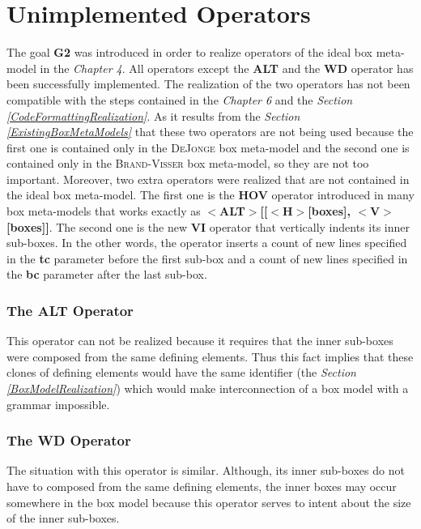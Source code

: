 \documentclass[12pt,notitlepage,a4paper]{report}
\begin{document}
\section{Unimplemented Operators}
\label{UnimplementedOperators}
The goal \textbf{G2} was introduced in order to realize operators of the ideal box meta-model in the \textit{Chapter 4}. All operators except the \textbf{ALT} and the \textbf{WD} operator has been successfully implemented. The realization of the two operators has not been compatible with the steps contained in the \textit{Chapter 6} and the \textit{Section \ref{CodeFormattingRealization}}. As it results from the \textit{Section \ref{ExistingBoxMetaModels}} that these two operators are not being used because the first one is contained only in the \textsc{DeJonge} box meta-model and the second one is contained only in the \textsc{Brand-Visser} box meta-model, so they are not too important. Moreover, two extra operators were realized that are not contained in the ideal box meta-model. The first one is the \textbf{HOV} operator introduced in many box meta-models that works exactly as \textbf{$<$ALT$>$[[$<$H$>$[boxes], $<$V$>$[boxes]]}. The second one is the new \textbf{VI} operator that vertically indents its inner sub-boxes. In the other words, the operator inserts a count of new lines specified in the \textbf{tc} parameter before the first sub-box and a count of  new lines specified in the \textbf{bc} parameter after the last sub-box.

\subsubsection{The ALT Operator}
This operator can not be realized because it requires that the inner sub-boxes were composed from the same defining elements. Thus this fact implies that these clones of defining elements would have the same identifier (the \textit{Section \ref{BoxModelRealization}}) which would make interconnection of a box model with a grammar impossible.

\subsubsection{The WD Operator}

The situation with this operator is similar. Although, its inner sub-boxes do not have to composed from the same defining elements, the inner boxes may occur somewhere in the box model because this operator serves to intent about the size of the	inner sub-boxes. 
\end{document}
